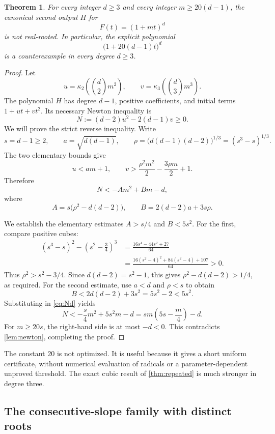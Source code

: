 \documentclass[11pt,letterpaper]{article}
\numberwithin{equation}{section}
\newtheorem{theorem}{Theorem}[section]
\theoremstyle{definition}
\theoremstyle{remark}
\newcommand{\kap}{\kappa}
\begin{document}
\begin{theorem}\label{thm:uniform}
For every integer $d\ge3$ and every integer $m\ge20(d-1)$, the canonical
second output $H$ for
\[
 F(t)=(1+mt)^d
\]
is not real-rooted. In particular, the explicit polynomial
\[
 \bigl(1+20(d-1)t\bigr)^d
\]
is a counterexample in every degree $d\ge3$.
\end{theorem}
\begin{proof}
Let
\[
 u=\kap_2\!\left(\binom d2m^2\right),\qquad
 v=\kap_3\!\left(\binom d3m^3\right).
\]
The polynomial $H$ has degree $d-1$, positive coefficients, and initial
terms $1+ut+vt^2$. Its necessary Newton inequality is
\[
 N:=(d-2)u^2-2(d-1)v\ge0.
\]
We will prove the strict reverse inequality. Write
\[
 s=d-1\ge2,\qquad a=\sqrt{d(d-1)},\qquad
 \rho=\bigl(d(d-1)(d-2)\bigr)^{1/3}=(s^3-s)^{1/3}.
\]
The two elementary bounds give
\[
 u<am+1,\qquad
 v>\frac{\rho^2m^2}{2}-\frac{3\rho m}{2}+1.
\]
Therefore
\begin{equation}\label{eq:Nd}
 N<-A m^2+B m-d,
\end{equation}
where
\[
 A=s\bigl(\rho^2-d(d-2)\bigr),\qquad
 B=2(d-2)a+3s\rho.
\]

We establish the elementary estimates $A>s/4$ and $B<5s^2$.
For the first, compare positive cubes:
\begin{align*}
 (s^3-s)^2-\left(s^2-\frac34\right)^3
 &=\frac{16s^4-44s^2+27}{64}\\
 &=\frac{16(s^2-4)^2+84(s^2-4)+107}{64}>0.
\end{align*}
Thus $\rho^2>s^2-3/4$. Since $d(d-2)=s^2-1$, this gives
$\rho^2-d(d-2)>1/4$, as required. For the second estimate, use $a<d$ and
$\rho<s$ to obtain
\[
 B<2d(d-2)+3s^2=5s^2-2<5s^2.
\]
Substituting in \eqref{eq:Nd} yields
\begin{equation}\label{eq:uniformbound}
 N<-\frac{s}{4}m^2+5s^2m-d
   =sm\left(5s-\frac m4\right)-d.
\end{equation}
For $m\ge20s$, the right-hand side is at most $-d<0$. This contradicts
\cref{lem:newton}, completing the proof.
\end{proof}

The constant $20$ is not optimized. It is useful because it gives a short
uniform certificate, without numerical evaluation of radicals or a
parameter-dependent unproved threshold. The exact cubic result of
\cref{thm:repeated} is much stronger in degree three.

\subsection{The consecutive-slope family with distinct roots}
\label{subsec:consecutive}
\end{document}
